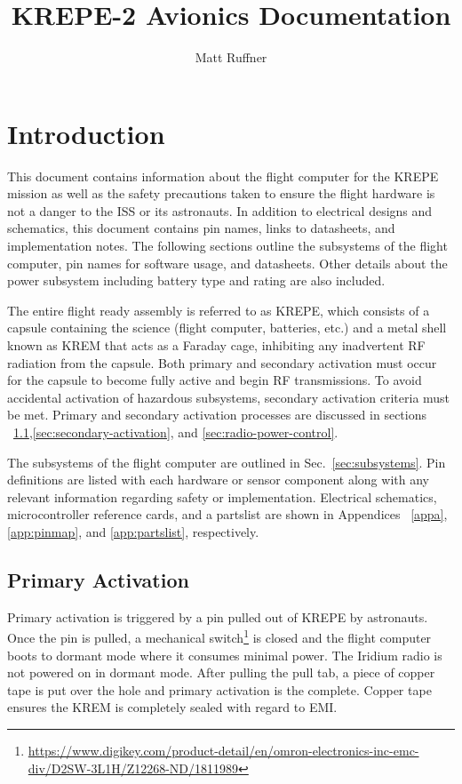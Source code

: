 \documentclass{article}
\title{KREPE-2 Avionics Documentation}
\author{Matt Ruffner}
\date{}
\begin{document}
\maketitle
\tableofcontents
\listoffigures
\listoftables
\newpage


\section{Introduction}

This document contains information about the flight computer for the KREPE mission as well as the safety precautions taken to ensure the flight hardware is not a danger to the ISS or its astronauts. In addition to electrical designs and schematics, this document contains pin names, links to datasheets, and implementation notes. The following sections outline the subsystems of the flight computer, pin names for software usage, and datasheets. Other details about the power subsystem including battery type and rating are also included. 

The entire flight ready assembly is referred to as KREPE, which consists of a capsule containing the science (flight computer, batteries, etc.) and a metal shell known as KREM that acts as a Faraday cage, inhibiting any inadvertent RF radiation from the capsule. Both primary and secondary activation must occur for the capsule to become fully active and begin RF transmissions. To avoid accidental activation of hazardous subsystems, secondary activation criteria must be met. Primary and secondary activation processes are discussed in sections ~\ref{sec:primary-activation},\ref{sec:secondary-activation}, and \ref{sec:radio-power-control}.

The subsystems of the flight computer are outlined in Sec.~\ref{sec:subsystems}. Pin definitions are listed with each hardware or sensor component along with any relevant information regarding safety or implementation. Electrical schematics, microcontroller reference cards, and a partslist are shown in  Appendices ~\ref{appa}, \ref{app:pinmap}, and \ref{app:partslist}, respectively.


\subsection{Primary Activation}
\label{sec:primary-activation}
Primary activation is triggered by a pin pulled out of KREPE by astronauts. Once the pin is pulled, a mechanical switch\footnote{\url{https://www.digikey.com/product-detail/en/omron-electronics-inc-emc-div/D2SW-3L1H/Z12268-ND/1811989}} is closed and the flight computer boots to dormant mode where it consumes minimal power. The Iridium radio is not powered on in dormant mode. After pulling the pull tab, a piece of copper tape is put over the hole and primary activation is the complete. Copper tape ensures the KREM is completely sealed with regard to EMI. 
\end{document}
